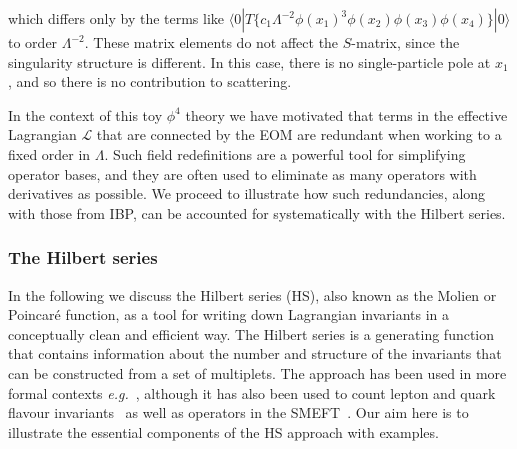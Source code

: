 which differs only by the terms like
$\langle 0 | T \{ c_{1} \Lambda^{-2} \phi(x_{1})^{3} \phi(x_{2}) \phi(x_{3}) \phi(x_{4}) \} | 0 \rangle$
to order $\Lambda^{-2}$. These matrix elements do not affect the $S$-matrix,
since the singularity structure is different. In this case, there is no
single-particle pole at $x_{1}$, and so there is no contribution to scattering.

In the context of this toy $\phi^{4}$ theory we have motivated that terms in the
effective Lagrangian $\mathscr{L}$ that are connected by the EOM are redundant
when working to a fixed order in $\Lambda$. Such field redefinitions are a
powerful tool for simplifying operator bases, and they are often used to
eliminate as many operators with derivatives as possible. We proceed to
illustrate how such redundancies, along with those from IBP, can be accounted
for systematically with the Hilbert series.

\subsubsection{The Hilbert series}

In the following we discuss the Hilbert series (HS), also known as the Molien or
Poincar\'{e} function, as a tool for writing down Lagrangian invariants in a
conceptually clean and efficient way. The Hilbert series is a generating
function that contains information about the number and structure of the
invariants that can be constructed from a set of multiplets. The approach has
been used in more formal contexts \textit{e.g.}~\cite{Pouliot:1998yv,
  Benvenuti:2006qr, Dolan:2007rq}, although it has also been used to count
lepton and quark flavour invariants~\cite{Hanany:2010vu, Jenkins:2009dy} as well
as operators in the SMEFT~\cite{Henning:2015alf}. Our aim here is to illustrate
the essential components of the HS approach with examples.


